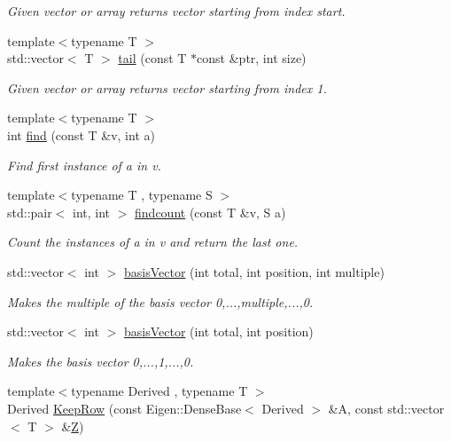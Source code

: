 \begin{DoxyCompactItemize}
\begin{DoxyCompactList}\small\item\em Given vector or array returns vector starting from index start. \end{DoxyCompactList}\item 
{\footnotesize template$<$typename T $>$ }\\std\+::vector$<$ T $>$ \hyperlink{namespaceMackey_a4403b34f0680dfccf2ab79111f832ba3}{tail} (const T $\ast$const \&ptr, int size)
\begin{DoxyCompactList}\small\item\em Given vector or array returns vector starting from index 1. \end{DoxyCompactList}\item 
{\footnotesize template$<$typename T $>$ }\\int \hyperlink{namespaceMackey_a74984d054f1f943ab61dd0415347f141}{find} (const T \&v, int a)
\begin{DoxyCompactList}\small\item\em Find first instance of a in v. \end{DoxyCompactList}\item 
{\footnotesize template$<$typename T , typename S $>$ }\\std\+::pair$<$ int, int $>$ \hyperlink{namespaceMackey_a1a7a26880f8c7c087503e2bc16168d3c}{findcount} (const T \&v, S a)
\begin{DoxyCompactList}\small\item\em Count the instances of a in v and return the last one. \end{DoxyCompactList}\item 
std\+::vector$<$ int $>$ \hyperlink{namespaceMackey_a86cc6cbaa708580f4e382b066bd0b7d4}{basis\+Vector} (int total, int position, int multiple)
\begin{DoxyCompactList}\small\item\em Makes the multiple of the basis vector 0,...,multiple,...,0. \end{DoxyCompactList}\item 
std\+::vector$<$ int $>$ \hyperlink{namespaceMackey_ae3454eb9b2574a835a29e3f58cfc6ead}{basis\+Vector} (int total, int position)
\begin{DoxyCompactList}\small\item\em Makes the basis vector 0,...,1,...,0. \end{DoxyCompactList}\item 
{\footnotesize template$<$typename Derived , typename T $>$ }\\Derived \hyperlink{namespaceMackey_ae44b27dcf905a7ff976ebc79f197c579}{Keep\+Row} (const Eigen\+::\+Dense\+Base$<$ Derived $>$ \&A, const std\+::vector$<$ T $>$ \&\hyperlink{classZ}{Z})

\end{DoxyCompactItemize}
